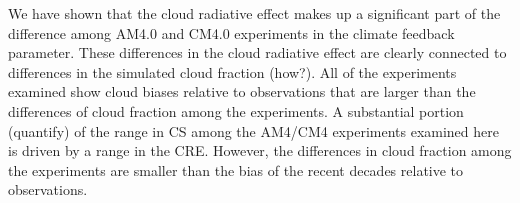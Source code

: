 \documentclass[draft]{agujournal2019}
\begin{document}
We have shown that the cloud radiative effect makes up a significant part of the difference 
among AM4.0 and CM4.0 experiments in the climate feedback parameter.  These differences in the cloud radiative
effect are clearly connected to differences in the simulated cloud fraction (how?).  
All of the experiments examined show cloud biases relative to observations that are larger than the differences of cloud fraction among the experiments.    
A substantial portion (quantify) of the range in CS among the AM4/CM4 experiments examined here is 
driven by a range in the CRE.  However, the differences in cloud fraction among the experiments are smaller than 
the bias of the recent decades relative to observations.  

\end{document}
